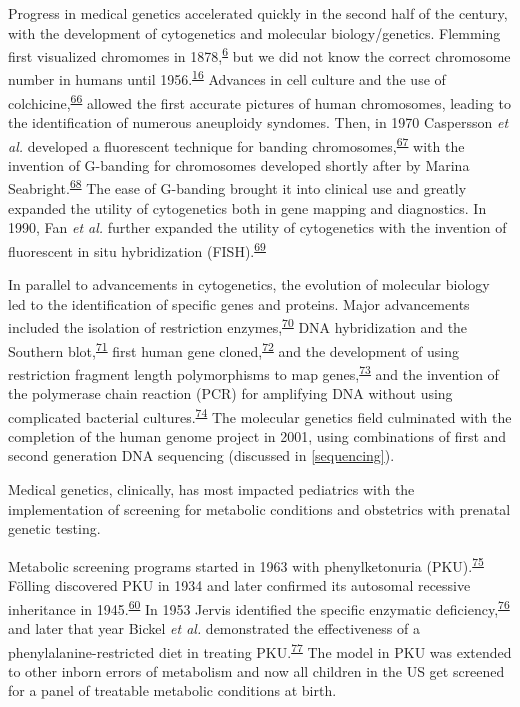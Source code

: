 \documentclass[11pt,letterpaper]{book}
\begin{document}
Progress in medical genetics accelerated quickly in the second half of the century, with the development of cytogenetics and molecular biology/genetics.
Flemming first visualized chromomes in 1878,\textsuperscript{\protect\hyperlink{ref-flemming:1878aa}{6}} but we did not know the correct chromosome number in humans until 1956.\textsuperscript{\protect\hyperlink{ref-tjio:1956aa}{16}}
Advances in cell culture and the use of colchicine,\textsuperscript{\protect\hyperlink{ref-levan:1938aa}{66}} allowed the first accurate pictures of human chromosomes, leading to the identification of numerous aneuploidy syndomes.
Then, in 1970 Caspersson \emph{et al.} developed a fluorescent technique for banding chromosomes,\textsuperscript{\protect\hyperlink{ref-caspersson:1970aa}{67}} with the invention of G-banding for chromosomes developed shortly after by Marina Seabright.\textsuperscript{\protect\hyperlink{ref-seabright:1971aa}{68}}
The ease of G-banding brought it into clinical use and greatly expanded the utility of cytogenetics both in gene mapping and diagnostics.
In 1990, Fan \emph{et al.} further expanded the utility of cytogenetics with the invention of fluorescent in situ hybridization (FISH).\textsuperscript{\protect\hyperlink{ref-fan:1990aa}{69}}

In parallel to advancements in cytogenetics, the evolution of molecular biology led to the identification of specific genes and proteins.
Major advancements included the isolation of restriction enzymes,\textsuperscript{\protect\hyperlink{ref-danna:1971aa}{70}} DNA hybridization and the Southern blot,\textsuperscript{\protect\hyperlink{ref-southern:1975aa}{71}} first human gene cloned,\textsuperscript{\protect\hyperlink{ref-shine:1977aa}{72}} and the development of using restriction fragment length polymorphisms to map genes,\textsuperscript{\protect\hyperlink{ref-botstein:1980aa}{73}} and the invention of the polymerase chain reaction (PCR) for amplifying DNA without using complicated bacterial cultures.\textsuperscript{\protect\hyperlink{ref-mullis:1986aa}{74}}
The molecular genetics field culminated with the completion of the human genome project in 2001, using combinations of first and second generation DNA sequencing (discussed in \ref{sequencing}).

Medical genetics, clinically, has most impacted pediatrics with the implementation of screening for metabolic conditions and obstetrics with prenatal genetic testing.

Metabolic screening programs started in 1963 with phenylketonuria (PKU).\textsuperscript{\protect\hyperlink{ref-guthrie:1963aa}{75}}
Fölling discovered PKU in 1934 and later confirmed its autosomal recessive inheritance in 1945.\textsuperscript{\protect\hyperlink{ref-harper:2008aa}{60}}
In 1953 Jervis identified the specific enzymatic deficiency,\textsuperscript{\protect\hyperlink{ref-jervis:1953aa}{76}} and later that year Bickel \emph{et al.} demonstrated the effectiveness of a phenylalanine-restricted diet in treating PKU.\textsuperscript{\protect\hyperlink{ref-bickel:1953aa}{77}}
The model in PKU was extended to other inborn errors of metabolism and now all children in the US get screened for a panel of treatable metabolic conditions at birth.
\end{document}
